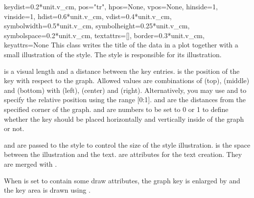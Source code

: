 \begin{classdesc}{key}{dist=0.2*unit.v\_cm,
                       pos="tr", hpos=None, vpos=None,
                       hinside=1, vinside=1,
                       hdist=0.6*unit.v\_cm,
                       vdist=0.4*unit.v\_cm,
                       symbolwidth=0.5*unit.v\_cm,
                       symbolheight=0.25*unit.v\_cm,
                       symbolspace=0.2*unit.v\_cm,
                       textattrs=[],
                       border=0.3*unit.v\_cm, keyattrs=None}
  This class writes the title of the data in a plot together with a
  small illustration of the style. The style is responsible for its
  illustration.

   is a visual length and a distance between the key
  entries.  is the position of the key with respect to the
  graph. Allowed values are combinations of  (top),
   (middle) and  (bottom) with  (left),
   (center) and  (right). Alternatively, you may
  use  and  to specify the relative position
  using the range [0:1].  and  are the distances
  from the specified corner of the graph.  and
   are numbers to be set to 0 or 1 to define whether the
  key should be placed horizontally and vertically inside of the graph
  or not.

   and  are passed to the style to
  control the size of the style illustration.  is the
  space between the illustration and the text.  are
  attributes for the text creation. They are merged with
  .

  When  is set to contain some draw attributes, the
  graph key is enlarged by  and the key area is drawn
  using .
\end{classdesc} %

